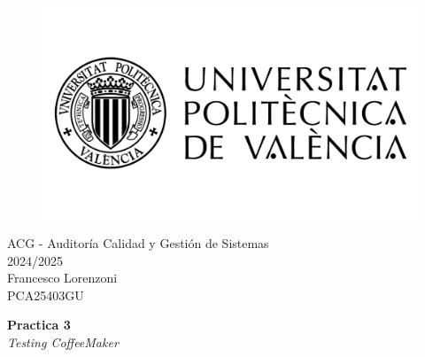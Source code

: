 \begin{titlepage}
   \begin{figure}
      \vspace{50mm}
       \centering
       \includegraphics[keepaspectratio=true,width=0.40\columnwidth]{images/upvLogo.png}
   \end{figure}
   
   \vspace{40mm}
   \begin{center}
       \LARGE{ACG - Auditoría Calidad y Gestión de Sistemas}
       \vspace{2.5mm}
       \\ \large{2024/2025}
       \vspace{5mm}
       \\ \large{Francesco Lorenzoni\\\textsc{PCA25403GU}}
   \end{center}
   
   \begin{center}
      \vspace{10mm}
       {\LARGE{\textbf{Practica 3}\\ \vspace{5mm}
       \textit{Testing CoffeeMaker}}}
       
   \end{center}
\end{titlepage}